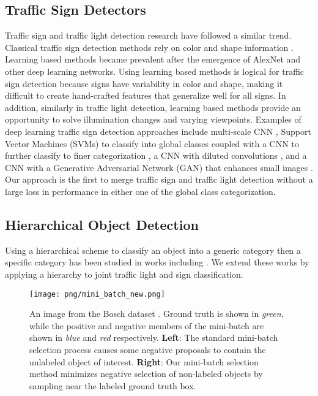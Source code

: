 \documentclass[10pt, conference, compsocconf]{IEEEtran}
\begin{document}
\subsection{Traffic Sign Detectors}
Traffic sign and traffic light detection research have followed a similar trend. Classical traffic sign detection methods rely on color and shape information \cite{escalera, benallal, ruta}. Learning based methods became prevalent after the emergence of AlexNet \cite{Krizhevsky} and other deep learning networks. Using learning based methods is logical for traffic sign detection because signs have variability in color and shape, making it difficult to create hand-crafted features that generalize well for all signs. In addition, similarly in traffic light detection, learning based methods provide an opportunity to solve illumination changes and varying viewpoints. Examples of deep learning traffic sign detection approaches include multi-scale CNN \cite{sermanet}, Support Vector Machines (SVMs) to classify into global classes coupled with a CNN to further classify to finer categorization \cite{yang}, a CNN with diluted convolutions \cite{aghdam}, and a CNN with a Generative Adversarial Network (GAN) that enhances small images \cite{perceptual_gan}. Our approach is the first to merge traffic sign and traffic light detection without a large loss in performance in either one of the global class categorization.

\subsection{Hierarchical Object Detection}
Using a hierarchical scheme to classify an object into a generic category then a specific category has been studied in works including \cite{meger, hoai}. We extend these works by applying a hierarchy to joint traffic light and sign classification.

\begin{figure}[b]
\begin{center}
\texttt{[image: png/mini\_batch\_new.png]}
\end{center}
\caption{An image from the Bosch dataset \cite{behrendt2017}. Ground truth is shown in \textit{green}, while the positive and negative members of the mini-batch are shown in \textit{blue} and \textit{red} respectively. \textbf{Left}: The standard mini-batch selection process causes some negative proposals to contain the unlabeled object of interest. \textbf{Right}: Our mini-batch selection method minimizes negative selection of non-labeled objects by sampling near the labeled ground truth box. }
\label{mini_batch}
\end{figure}
\end{document}
